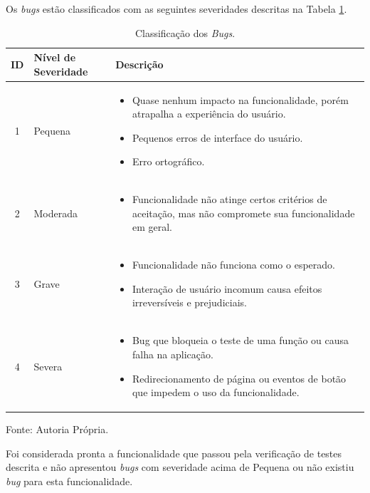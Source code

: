 Os \textit{bugs} estão classificados com as seguintes severidades descritas na Tabela \ref{tab:classificacao-bugs}.

\newpage

\begin{table}[h!]
    \centering
    \caption{Classificação dos \textit{Bugs}.}
    \label{tab:classificacao-bugs}
    \begin{tabularx}{\linewidth}{|c|l|X|}
        \hline
        \textbf{ID} & \textbf{Nível de Severidade} & \textbf{Descrição} \\
        \hline
        1 & Pequena & 
        \begin{itemize}
            \item Quase nenhum impacto na funcionalidade, porém atrapalha a experiência do usuário.
            \item Pequenos erros de interface do usuário.
            \item Erro ortográfico.
        \end{itemize}
        \\
        \hline
        2 & Moderada & 
        \begin{itemize}
            \item Funcionalidade não atinge certos critérios de aceitação, mas não compromete sua funcionalidade em geral.
        \end{itemize}
        \\
        \hline
        3 & Grave &
        \begin{itemize}
            \item Funcionalidade não funciona como o esperado.
            \item Interação de usuário incomum causa efeitos irreversíveis e prejudiciais.
        \end{itemize}
        \\
        \hline
        4 & Severa &
        \begin{itemize}
            \item Bug que bloqueia o teste de uma função ou causa falha na aplicação.
            \item Redirecionamento de página ou eventos de botão que impedem o uso da funcionalidade.
        \end{itemize}
        \\
        \hline
    \end{tabularx}
    \vspace{0.2cm} %
    
    Fonte: Autoria Própria.
\end{table}

Foi considerada pronta a funcionalidade que passou pela verificação de testes descrita e não apresentou \textit{bugs} com  severidade acima de Pequena ou não existiu \textit{bug} para esta funcionalidade.
